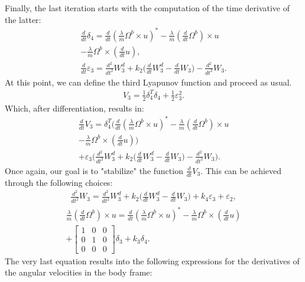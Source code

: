 Finally, the last iteration starts with the computation of the time derivative of the latter:
\begin{gather*}
    \frac{d}{dt}\delta_4 = \frac{d}{dt} \left( \frac{\lambda}{m} \Omega^b \times u \right)^* - \frac{\lambda}{m} \left( \frac{d}{dt} \Omega^b \right) \times u  \\ - \frac{\lambda}{m} \Omega^b \times \left( \frac{d}{dt} u \right), \\
    \frac{d}{dt} \varepsilon_3 = \frac{d^2}{dt^2} W_3^d + k_2 \bigg(\frac{d}{dt} W_3^d - \frac{d}{dt} W_3 \bigg) - \frac{d^2}{dt^2} W_3.
\end{gather*}
At this point, we can define the third Lyapunov function and proceed as usual.
\begin{gather*}
    V_3 = \frac{1}{2} \delta_4^T \delta_4 + \frac{1}{2} \varepsilon_3^2.
\end{gather*}
Which, after differentiation, results in:
\begin{gather*}
    \frac{d}{dt}V_3 = \delta_4^T \bigg( \frac{d}{dt} \left( \frac{\lambda}{m} \Omega^b \times u \right)^* - \frac{\lambda}{m} \left( \frac{d}{dt} \Omega^b \right) \times u \\ - \frac{\lambda}{m} \Omega^b \times \left( \frac{d}{dt} u \right) \bigg) \\
    + \varepsilon_3 \bigg( \frac{d^2}{dt^2} W_3^d + k_2 \bigg( \frac{d}{dt} W_3^d - \frac{d}{dt} W_3 \bigg) - \frac{d^2}{dt^2} W_3 \bigg).
\end{gather*}
Once again, our  goal is to "stabilize" the function $\frac{d}{dt}V_3$. This can be achieved through the following choices:
\begin{align*}
	\frac{d^2}{dt^2} W_3 = \frac{d^2}{dt^2} W_3^d + k_2\bigg( \frac{d}{dt} W_3^d - \frac{d}{dt} W_3 \bigg) + k_4\varepsilon_3 + \varepsilon_2,
\end{align*}
\begin{gather*}
	 \frac{\lambda}{m} \left( \frac{d}{dt} \Omega^b \right) \times u =  \frac{d}{dt} \left( \frac{\lambda}{m} \Omega^b \times u \right)^* - \frac{\lambda}{m} \Omega^b \times \left(\frac{d}{dt} u\right) \\ + \begin{bmatrix} 1 & 0 & 0 \\ 0 & 1 & 0 \\ 0 & 0 & 0 \end{bmatrix}\delta_3 + k_3\delta_4.
\end{gather*}
The very last equation results into the following expressions for the derivatives of the angular velocities in the body frame:
